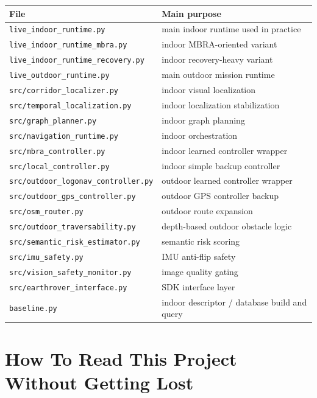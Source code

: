 \documentclass[11pt]{article}
\begin{document}
\begin{longtable}{p{}p{}}
\toprule
\textbf{File} & \textbf{Main purpose} \\
\midrule
\texttt{live\_indoor\_runtime.py} & main indoor runtime used in practice \\
\texttt{live\_indoor\_runtime\_mbra.py} & indoor MBRA-oriented variant \\
\texttt{live\_indoor\_runtime\_recovery.py} & indoor recovery-heavy variant \\
\texttt{live\_outdoor\_runtime.py} & main outdoor mission runtime \\
\texttt{src/corridor\_localizer.py} & indoor visual localization \\
\texttt{src/temporal\_localization.py} & indoor localization stabilization \\
\texttt{src/graph\_planner.py} & indoor graph planning \\
\texttt{src/navigation\_runtime.py} & indoor orchestration \\
\texttt{src/mbra\_controller.py} & indoor learned controller wrapper \\
\texttt{src/local\_controller.py} & indoor simple backup controller \\
\texttt{src/outdoor\_logonav\_controller.py} & outdoor learned controller wrapper \\
\texttt{src/outdoor\_gps\_controller.py} & outdoor GPS controller backup \\
\texttt{src/osm\_router.py} & outdoor route expansion \\
\texttt{src/outdoor\_traversability.py} & depth-based outdoor obstacle logic \\
\texttt{src/semantic\_risk\_estimator.py} & semantic risk scoring \\
\texttt{src/imu\_safety.py} & IMU anti-flip safety \\
\texttt{src/vision\_safety\_monitor.py} & image quality gating \\
\texttt{src/earthrover\_interface.py} & SDK interface layer \\
\texttt{baseline.py} & indoor descriptor / database build and query \\
\bottomrule
\end{longtable}

\section{How To Read This Project Without Getting Lost}
\end{document}

